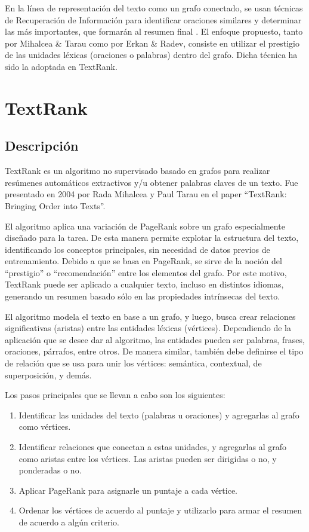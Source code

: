 \documentclass{llncs}
\begin{document}
En la línea de representación del texto como un grafo conectado, se usan técnicas de Recuperación de Información para identificar oraciones similares y determinar las más importantes, que formarán al resumen final \cite{salton}. El enfoque propuesto, tanto por Mihalcea \& Tarau como por Erkan \& Radev, consiste en utilizar el prestigio de las unidades léxicas (oraciones o palabras) dentro del grafo. Dicha técnica ha sido la adoptada en TextRank.


\section{TextRank}

\subsection{Descripción}
TextRank es un algoritmo no supervisado basado en grafos para realizar resúmenes automáticos extractivos y/u obtener palabras claves de un texto. Fue presentado en 2004 por Rada Mihalcea y Paul Tarau en el paper “TextRank: Bringing Order into Texts”.

El algoritmo aplica una variación de PageRank sobre un grafo especialmente diseñado para la tarea. De esta manera permite explotar la estructura del texto, identificando los conceptos principales, sin necesidad de datos previos de entrenamiento. Debido a que se basa en PageRank, se sirve de la noción del “prestigio” o “recomendación” entre los elementos del grafo. Por este motivo, TextRank puede ser aplicado a cualquier texto, incluso en distintos idiomas, generando un resumen basado sólo en las propiedades intrínsecas del texto.

El algoritmo modela el texto en base a un grafo, y luego, busca crear relaciones significativas (aristas) entre las entidades léxicas (vértices). Dependiendo de la aplicación que se desee dar al algoritmo, las entidades pueden ser palabras, frases, oraciones, párrafos, entre otros. De manera similar, también debe definirse el tipo de relación que se usa para unir los vértices: semántica, contextual, de superposición, y demás.

Los pasos principales que se llevan a cabo son los siguientes:

\begin{enumerate}
\item Identificar las unidades del texto (palabras u oraciones) y agregarlas al grafo como vértices.
\item Identificar relaciones que conectan a estas unidades, y agregarlas al grafo como aristas entre los vértices. Las aristas pueden ser dirigidas o no, y ponderadas o no.
\item Aplicar PageRank para asignarle un puntaje a cada vértice.
\item Ordenar los vértices de acuerdo al puntaje y utilizarlo para armar el resumen de acuerdo a algún criterio.
\end{enumerate}
\end{document}
